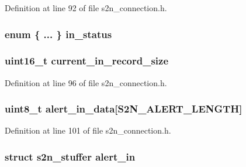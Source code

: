 Definition at line 92 of file s2n\+\_\+connection.\+h.

\subsubsection[{\texorpdfstring{in\+\_\+status}{in_status}}]{\setlength{\rightskip}{0pt plus 5cm}enum \{ ... \}   in\+\_\+status}\hypertarget{structs2n__connection_ad63a0cc0cc12429207575e5d093f59d2}{}\label{structs2n__connection_ad63a0cc0cc12429207575e5d093f59d2}
\subsubsection[{\texorpdfstring{current\+\_\+in\+\_\+record\+\_\+size}{current_in_record_size}}]{\setlength{\rightskip}{0pt plus 5cm}uint16\+\_\+t current\+\_\+in\+\_\+record\+\_\+size}\hypertarget{structs2n__connection_a9660c08a72961b73e1ec79a862591ee7}{}\label{structs2n__connection_a9660c08a72961b73e1ec79a862591ee7}


Definition at line 96 of file s2n\+\_\+connection.\+h.

\subsubsection[{\texorpdfstring{alert\+\_\+in\+\_\+data}{alert_in_data}}]{\setlength{\rightskip}{0pt plus 5cm}uint8\+\_\+t alert\+\_\+in\+\_\+data\mbox{[}{\bf S2\+N\+\_\+\+A\+L\+E\+R\+T\+\_\+\+L\+E\+N\+G\+TH}\mbox{]}}\hypertarget{structs2n__connection_aac009a408307ec7913db2b2b159465fd}{}\label{structs2n__connection_aac009a408307ec7913db2b2b159465fd}


Definition at line 101 of file s2n\+\_\+connection.\+h.

\subsubsection[{\texorpdfstring{alert\+\_\+in}{alert_in}}]{\setlength{\rightskip}{0pt plus 5cm}struct {\bf s2n\+\_\+stuffer} alert\+\_\+in}\hypertarget{structs2n__connection_a628dd7fe79c7cfd5f7bc02da8a270752}{}\label{structs2n__connection_a628dd7fe79c7cfd5f7bc02da8a270752}


